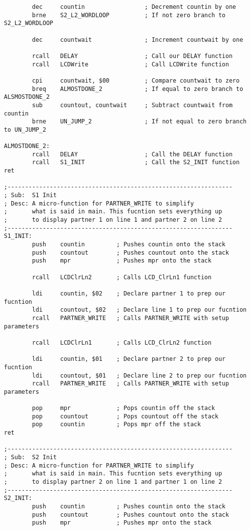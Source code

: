 \documentclass[12pt, letterpaper]{article}
\begin{document}
\begin{verbatim}
		dec		countin					; Decrement countin by one
		brne	S2_L2_WORDLOOP			; If not zero branch to S2_L2_WORDLOOP

		dec		countwait				; Increment countwait by one

		rcall	DELAY					; Call our DELAY function
		rcall	LCDWrite				; Call LCDWrite function

		cpi		countwait, $00			; Compare countwait to zero
		breq	ALMOSTDONE_2			; If equal to zero branch to ALSMOSTDONE_2
		sub		countout, countwait		; Subtract countwait from countin
		brne	UN_JUMP_2				; If not equal to zero branch to UN_JUMP_2

ALMOSTDONE_2:
		rcall	DELAY					; Call the DELAY function
		rcall	S1_INIT					; Call the S2_INIT function
ret

;----------------------------------------------------------------
; Sub:	S1 Init
; Desc:	A micro-function for PARTNER_WRITE to simplify
;		what is said in main. This fucntion sets everything up
;		to display partner 1 on line 1 and partner 2 on line 2
;----------------------------------------------------------------
S1_INIT:
		push	countin			; Pushes countin onto the stack
		push	countout		; Pushes countout onto the stack
		push	mpr				; Pushes mpr onto the stack

		rcall	LCDClrLn2		; Calls LCD_ClrLn1 function

		ldi		countin, $02	; Declare partner 1 to prep our fucntion
		ldi		countout, $02	; Declare line 1 to prep our fucntion
		rcall	PARTNER_WRITE	; Calls PARTNER_WRITE with setup parameters

		rcall	LCDClrLn1		; Calls LCD_ClrLn2 function

		ldi		countin, $01	; Declare partner 2 to prep our fucntion
		ldi		countout, $01	; Declare line 2 to prep our fucntion
		rcall	PARTNER_WRITE	; Calls PARTNER_WRITE with setup parameters

		pop		mpr				; Pops countin off the stack
		pop		countout		; Pops countout off the stack
		pop		countin			; Pops mpr off the stack
ret

;----------------------------------------------------------------
; Sub:	S2 Init
; Desc:	A micro-function for PARTNER_WRITE to simplify
;		what is said in main. This fucntion sets everything up
;		to display partner 2 on line 1 and partner 1 on line 2
;----------------------------------------------------------------
S2_INIT:
		push	countin			; Pushes countin onto the stack
		push	countout		; Pushes countout onto the stack
		push	mpr				; Pushes mpr onto the stack


\end{verbatim}
\end{document}

